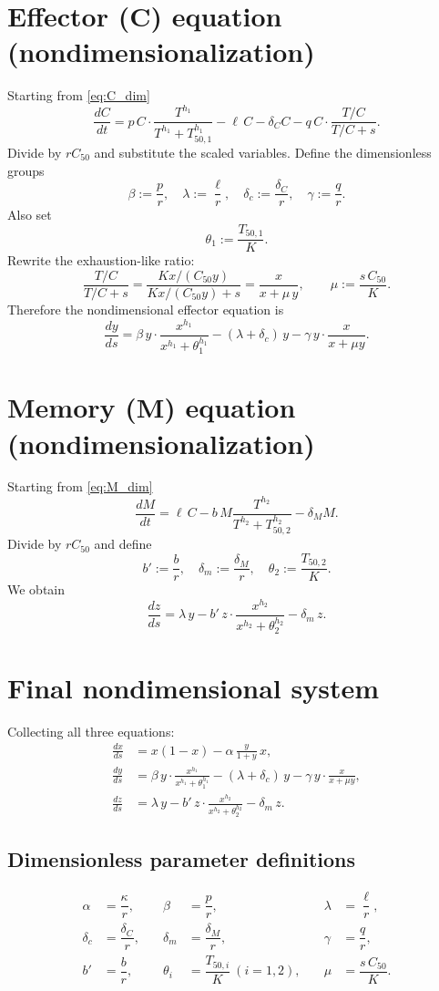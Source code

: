 \documentclass[11pt]{article}
\begin{document}
\section*{Effector (C) equation (nondimensionalization)}
Starting from \eqref{eq:C_dim}
\[
\frac{dC}{dt} = p\,C\cdot\frac{T^{h_1}}{T^{h_1}+T_{50,1}^{h_1}} - \ell\,C - \delta_C C - q\,C\cdot\frac{T/C}{T/C + s}.
\]
Divide by \(r C_{50}\) and substitute the scaled variables.
Define the dimensionless groups
\[
\beta := \frac{p}{r},\quad
\lambda := \frac{\ell}{r},\quad
\delta_c := \frac{\delta_C}{r},\quad
\gamma := \frac{q}{r}.
\]
Also set
\[
\theta_1 := \frac{T_{50,1}}{K}.
\]
Rewrite the exhaustion-like ratio:
\[
\frac{T/C}{T/C + s}
= \frac{Kx/(C_{50}y)}{Kx/(C_{50}y) + s}
= \frac{x}{x + \mu\,y},\qquad
\mu := \frac{s\,C_{50}}{K}.
\]
Therefore the nondimensional effector equation is
\[
\boxed{\displaystyle
\frac{dy}{ds} = \beta\, y\cdot\frac{x^{h_1}}{x^{h_1}+\theta_1^{h_1}} - (\lambda + \delta_c)\,y - \gamma\, y\cdot\frac{x}{x+\mu y}.}
\]

\bigskip

\section*{Memory (M) equation (nondimensionalization)}
Starting from \eqref{eq:M_dim}
\[
\frac{dM}{dt} = \ell\,C - b\,M\frac{T^{h_2}}{T^{h_2}+T_{50,2}^{h_2}} - \delta_M M.
\]
Divide by \(r C_{50}\) and define
\[
b' := \frac{b}{r},\quad \delta_m := \frac{\delta_M}{r},\quad \theta_2 := \frac{T_{50,2}}{K}.
\]
We obtain
\[
\boxed{\displaystyle
\frac{dz}{ds} = \lambda\, y - b'\, z\cdot\frac{x^{h_2}}{x^{h_2} + \theta_2^{h_2}} - \delta_m\, z.}
\]

\bigskip

\section*{Final nondimensional system}
Collecting all three equations:
\[
\boxed{\begin{aligned}
\frac{dx}{ds} &= x(1-x) - \alpha\,\frac{y}{1+y}\,x,\\[6pt]
\frac{dy}{ds} &= \beta\, y\cdot\frac{x^{h_1}}{x^{h_1}+\theta_1^{h_1}} - (\lambda + \delta_c)\,y - \gamma\, y\cdot\frac{x}{x+\mu y},\\[6pt]
\frac{dz}{ds} &= \lambda\, y - b'\, z\cdot\frac{x^{h_2}}{x^{h_2} + \theta_2^{h_2}} - \delta_m\, z.
\end{aligned}}
\]

\subsection*{Dimensionless parameter definitions}
\[
\begin{aligned}
\alpha &= \dfrac{\kappa}{r}, &\quad
\beta &= \dfrac{p}{r}, &\quad
\lambda &= \dfrac{\ell}{r},\\[4pt]
\delta_c &= \dfrac{\delta_C}{r}, &\quad
\delta_m &= \dfrac{\delta_M}{r}, &\quad
\gamma &= \dfrac{q}{r},\\[4pt]
b' &= \dfrac{b}{r}, &\quad
\theta_i &= \dfrac{T_{50,i}}{K}\ (i=1,2), &\quad
\mu &= \dfrac{s\,C_{50}}{K}.
\end{aligned}
\]
\end{document}
